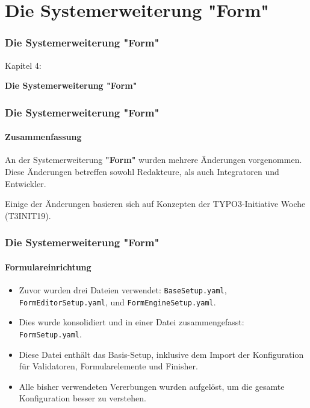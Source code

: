 %

\section{Die Systemerweiterung "Form"}
\begin{frame}[fragile]
	\frametitle{Die Systemerweiterung "Form"}

	\begin{center}\huge{Kapitel 4:}\end{center}
	\begin{center}\huge{\color{typo3darkgrey}\textbf{Die Systemerweiterung "Form"}}\end{center}

\end{frame}


\begin{frame}[fragile]
	\frametitle{Die Systemerweiterung "Form"}
	\framesubtitle{Zusammenfassung}

	\small
		An der Systemerweiterung \textbf{"Form"} wurden mehrere Änderungen vorgenommen.
		Diese Änderungen betreffen sowohl Redakteure, als auch Integratoren und Entwickler.

		\vspace{0.2cm}

		Einige der Änderungen basieren sich auf Konzepten der TYPO3-Initiative Woche (T3INIT19).

	\normalsize

\end{frame}


\begin{frame}[fragile]
	\frametitle{Die Systemerweiterung "Form"}
	\framesubtitle{Formulareinrichtung}

	\begin{itemize}
		\item Zuvor wurden drei Dateien verwendet: \texttt{BaseSetup.yaml}, \texttt{FormEditorSetup.yaml}, und \texttt{FormEngineSetup.yaml}.
		\item Dies wurde konsolidiert und in einer Datei zusammengefasst: \texttt{FormSetup.yaml}.
		\item Diese Datei enthält das Basis-Setup, inklusive dem Import der Konfiguration für Validatoren, Formularelemente und Finisher.
		\item Alle bisher verwendeten Vererbungen wurden aufgelöst, um die gesamte Konfiguration besser zu verstehen.
	\end{itemize}

\end{frame}

